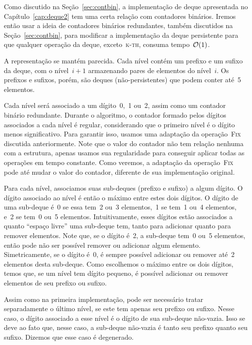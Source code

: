 \documentclass[../../main.tex]{subfiles}
\begin{document}
Como discutido na Seção~\ref{sec:contbin}, a implementação de deque apresentada no Capítulo~\ref{cap:deque2} tem uma certa relação com contadores binários. Iremos então usar a ideia de contadores binários redundantes, também discutidos na Seção~\ref{sec:contbin}, para modificar a implementação da deque persistente para que qualquer operação da deque, exceto~\textsc{k-th}, consuma tempo~$\mathcal{O}(1)$.

A representação se mantém parecida. Cada nível contém um prefixo e um sufixo da deque, com o nível~$i+1$ armazenando pares de elementos do nível~$i$. Os prefixos e sufixos, porém, são deques (não-persistentes) que podem conter até~5 elementos.

Cada nível será associado a um dígito~0,~1 ou~2, assim como um contador binário redundante. Durante o algoritmo, o contador formado pelos dígitos associados a cada nível é regular, considerando que o primeiro nível é o dígito menos significativo. Para garantir isso, usamos uma adaptação da operação~\textsc{Fix} discutida anteriormente. Note que o valor do contador não tem relação nenhuma com a estrutura, apenas usamos sua regularidade para conseguir aplicar todas as operações em tempo constante. Como veremos, a adaptação da operação~\textsc{Fix} pode até mudar o valor do contador, diferente de sua implementação original.

Para cada nível, associamos suas sub-deques (prefixo e sufixo) a algum dígito. O dígito associado ao nível é então o máximo entre estes dois dígitos. O dígito de uma sub-deque é~0 se essa tem~2 ou~3 elementos,~1 se tem~1 ou~4 elementos, e~2 se tem~0 ou~5 elementos. Intuitivamente, esses dígitos estão associados a quanto ``espaço livre'' uma sub-deque tem, tanto para adicionar quanto para remover elementos. Note que, se o dígito é~2, a sub-deque tem~0 ou~5 elementos, então pode não ser possível remover ou adicionar algum elemento. Simetricamente, se o dígito é~0, é sempre possível adicionar ou remover até~2 elementos desta sub-deque. Como escolhemos o máximo entre os dois dígitos, temos que, se um nível tem dígito pequeno, é possível adicionar ou remover elementos de seu prefixo ou sufixo.

Assim como na primeira implementação, pode ser necessário tratar separadamente o último nível, se este tem apenas seu prefixo ou sufixo. Nesse caso, o dígito associado a esse nível é o dígito de sua sub-deque não-vazia. Isso se deve ao fato que, nesse caso, a sub-deque não-vazia é tanto seu prefixo quanto seu sufixo. Dizemos que esse caso é degenerado.
\end{document}
